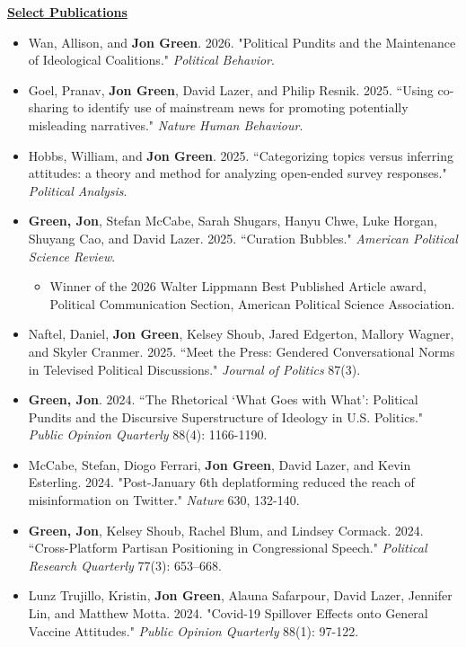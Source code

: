 \documentclass{article}
\begin{document}
\noindent \textbf{\underline{Select Publications}}
	\begin{itemize}
		\item Wan, Allison, and \textbf{Jon Green}. 2026. "Political Pundits and the Maintenance of Ideological Coalitions." \textit{Political Behavior}.
		\item Goel, Pranav, \textbf{Jon Green}, David Lazer, and Philip Resnik. 2025. ``Using co-sharing to identify use of mainstream news for promoting potentially misleading narratives." \textit{Nature Human Behaviour}.
		\item  Hobbs, William, and \textbf{Jon Green}. 2025. ``Categorizing topics versus inferring attitudes: a theory and method for analyzing open-ended survey responses." \textit{Political Analysis}.
		\item \textbf{Green, Jon}, Stefan McCabe, Sarah Shugars, Hanyu Chwe, Luke Horgan, Shuyang Cao, and David Lazer. 2025. ``Curation Bubbles." \textit{American Political Science Review}.
		\begin{itemize}
		\item Winner of the 2026 Walter Lippmann Best Published Article award, Political Communication Section, American Political Science Association.
		\end{itemize}
		\item Naftel, Daniel, \textbf{Jon Green}, Kelsey Shoub, Jared Edgerton, Mallory Wagner, and Skyler Cranmer. 2025. ``Meet the Press: Gendered Conversational Norms in Televised Political Discussions." \textit{Journal of Politics} 87(3).
		\item \textbf{Green, Jon}. 2024. ``The Rhetorical `What Goes with What': Political Pundits and the Discursive Superstructure of Ideology in U.S. Politics." \textit{Public Opinion Quarterly} 88(4): 1166-1190.
		\item McCabe, Stefan, Diogo Ferrari, \textbf{Jon Green}, David Lazer, and Kevin Esterling. 2024. "Post-January 6th deplatforming reduced the reach of misinformation on Twitter." \textit{Nature} 630, 132-140.
		\item \textbf{Green, Jon}, Kelsey Shoub, Rachel Blum, and Lindsey Cormack. 2024. ``Cross-Platform Partisan Positioning in Congressional Speech." \textit{Political Research Quarterly} 77(3): 653–668.
		\item Lunz Trujillo, Kristin, \textbf{Jon Green}, Alauna Safarpour, David Lazer, Jennifer Lin, and Matthew Motta. 2024. "Covid-19 Spillover Effects onto General Vaccine Attitudes." \textit{Public Opinion Quarterly} 88(1): 97-122.

\end{itemize}
\end{document}
